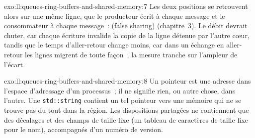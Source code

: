 \begin{solution}{exo:ll:queues-ring-buffers-and-shared-memory:7}
Les deux positions se retrouvent alors sur une même ligne, que le producteur écrit à chaque message et le consommateur à chaque message~:  (false sharing)
(chapitre~3). Le débit devrait chuter, car chaque écriture invalide la copie de la ligne détenue par l'autre cœur, tandis que le temps d'aller-retour change
moins, car dans un échange en aller-retour les lignes migrent de toute façon~; la mesure tranche sur l'ampleur de l'écart.
\end{solution}

\begin{solution}{exo:ll:queues-ring-buffers-and-shared-memory:8}
Un pointeur est une adresse dans l'espace d'adressage d'un processus~; il ne signifie rien, ou autre chose, dans l'autre. Une
\texttt{std::string} contient un tel pointeur vers une mémoire qui ne se trouve pas du tout dans la région. Les dispositions partagées ne contiennent que des décalages et des champs de taille fixe
(un tableau de caractères de taille fixe pour le nom), accompagnés d'un numéro de version.
\end{solution}


